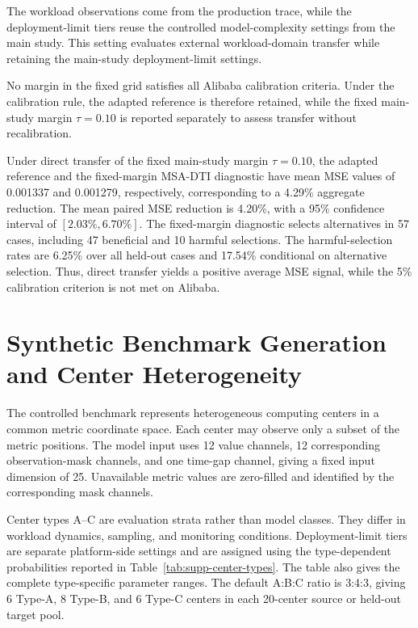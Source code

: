 \documentclass[11pt,a4paper]{article}
\begin{document}
The workload observations come from the production trace, while the
deployment-limit tiers reuse the controlled model-complexity settings from the
main study. This setting evaluates external workload-domain transfer while retaining the
main-study deployment-limit settings.

No margin in the fixed grid satisfies all Alibaba calibration criteria.
Under the calibration rule, the adapted reference is therefore retained,
while the fixed main-study margin $\tau=0.10$ is reported separately to
assess transfer without recalibration.

Under direct transfer of the fixed main-study margin $\tau=0.10$, the
adapted reference and the fixed-margin MSA-DTI diagnostic have mean MSE
values of 0.001337 and 0.001279, respectively, corresponding to a 4.29\%
aggregate reduction. The mean paired MSE reduction is 4.20\%, with a 95\%
confidence interval of $[2.03\%,6.70\%]$. The fixed-margin diagnostic selects
alternatives in 57 cases, including 47 beneficial and 10 harmful selections.
The harmful-selection rates are 6.25\% over all held-out cases and 17.54\%
conditional on alternative selection. Thus, direct transfer yields a positive
average MSE signal, while the 5\% calibration criterion is not met on
Alibaba.

\section{Synthetic Benchmark Generation and Center Heterogeneity}
\label{supp:synthetic-benchmark}

The controlled benchmark represents heterogeneous computing centers in a
common metric coordinate space.
Each center may observe only a subset of the metric positions.
The model input uses 12 value channels, 12 corresponding observation-mask
channels, and one time-gap channel, giving a fixed input dimension of 25.
Unavailable metric values are zero-filled and identified by the
corresponding mask channels.

Center types A--C are evaluation strata rather than model classes.
They differ in workload dynamics, sampling, and monitoring conditions.
Deployment-limit tiers are separate platform-side settings and are assigned
using the type-dependent probabilities reported in
Table~\ref{tab:supp-center-types}.
The table also gives the complete type-specific parameter ranges.
The default A:B:C ratio is 3:4:3, giving 6 Type-A, 8 Type-B, and 6 Type-C
centers in each 20-center source or held-out target pool.
\end{document}
